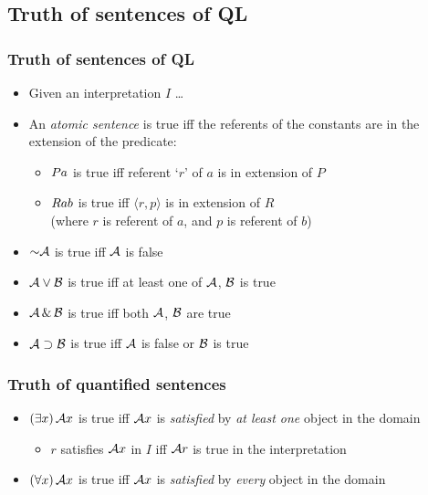 \subsection{Truth of sentences of QL}

\begin{frame}
  \frametitle{Truth of sentences of QL}

  \begin{itemize}[<+->]
    \item Given an interpretation $I$ \dots
    \item An \emph{atomic sentence} is true iff the referents of the constants are in the extension of the predicate:
    \begin{itemize}
    \item $Pa$ is true iff referent `$r$' of $a$ is in extension of $P$
    \item $Rab$ is true iff $\langle r,p\rangle$ is in extension of $R$\\
    (where $r$ is referent of $a$, and $p$ is referent of $b$)
    \end{itemize}
    \item $\enot\metav{A}$ is true iff $\mathcal{A}$ is false
    \item $\mathcal{A} \vee \mathcal{B}$ is true iff at least one of $\mathcal{A}$, $\mathcal{B}$ is true
    \item $\mathcal{A} \,\&\, \mathcal{B}$ is true iff both $\mathcal{A}$, $\mathcal{B}$ are true
    \item $\mathcal{A} \supset \mathcal{B}$ is true iff $\mathcal{A}$ is false or $\mathcal{B}$ is true
  \end{itemize}
\end{frame}

\begin{frame}
  \frametitle{Truth of quantified sentences}

  \begin{itemize}[<+->]
    \item $(\exists x)\,\mathcal{A}x$ is true iff $\mathcal{A}x$ is \emph{satisfied} by \emph{at least one} object in the domain
    \begin{itemize}
    \item $r$ satisfies $\mathcal{A}x$ in $I$ iff $\mathcal{A}r$ is true in the interpretation 
    \end{itemize}
    \bigskip
    
    \item $(\forall x)\,\mathcal{A}x$ is true iff $\mathcal{A}x$ is \emph{satisfied} by \emph{every} object in the domain
  \end{itemize}
\end{frame}

